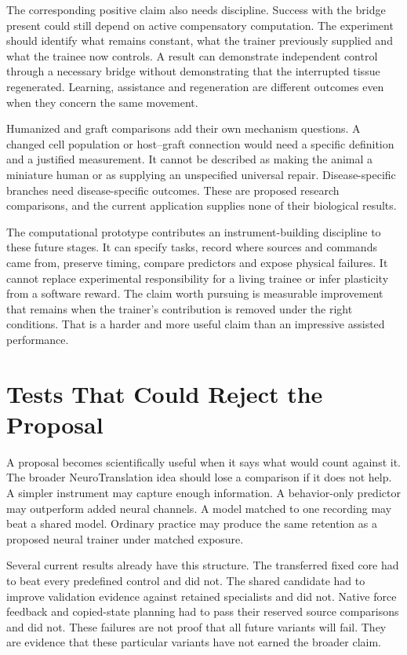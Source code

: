 The corresponding positive claim also needs discipline. Success with the bridge present could still depend on active compensatory computation. The experiment should identify what remains constant, what the trainer previously supplied and what the trainee now controls. A result can demonstrate independent control through a necessary bridge without demonstrating that the interrupted tissue regenerated. Learning, assistance and regeneration are different outcomes even when they concern the same movement.

Humanized and graft comparisons add their own mechanism questions. A changed cell population or host--graft connection would need a specific definition and a justified measurement. It cannot be described as making the animal a miniature human or as supplying an unspecified universal repair. Disease-specific branches need disease-specific outcomes. These are proposed research comparisons, and the current application supplies none of their biological results.

The computational prototype contributes an instrument-building discipline to these future stages. It can specify tasks, record where sources and commands came from, preserve timing, compare predictors and expose physical failures. It cannot replace experimental responsibility for a living trainee or infer plasticity from a software reward. The claim worth pursuing is measurable improvement that remains when the trainer's contribution is removed under the right conditions. That is a harder and more useful claim than an impressive assisted performance.

\section{Tests That Could Reject the Proposal}

A proposal becomes scientifically useful when it says what would count against it. The broader NeuroTranslation idea should lose a comparison if it does not help. A simpler instrument may capture enough information. A behavior-only predictor may outperform added neural channels. A model matched to one recording may beat a shared model. Ordinary practice may produce the same retention as a proposed neural trainer under matched exposure.

Several current results already have this structure. The transferred fixed core had to beat every predefined control and did not. The shared candidate had to improve validation evidence against retained specialists and did not. Native force feedback and copied-state planning had to pass their reserved source comparisons and did not. These failures are not proof that all future variants will fail. They are evidence that these particular variants have not earned the broader claim.

